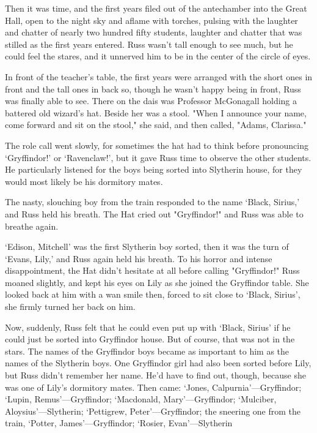 Then it was time, and the first years filed out of the antechamber into the Great Hall, open to the night sky and aflame with torches, pulsing with the laughter and chatter of nearly two hundred fifty students, laughter and chatter that was stilled as the first years entered. Russ wasn't tall enough to see much, but he could feel the stares, and it unnerved him to be in the center of the circle of eyes.

In front of the teacher's table, the first years were arranged with the short ones in front and the tall ones in back so, though he wasn't happy being in front, Russ was finally able to see. There on the dais was Professor McGonagall holding a battered old wizard's hat. Beside her was a stool. "When I announce your name, come forward and sit on the stool," she said, and then called, "Adams, Clarissa."

The role call went slowly, for sometimes the hat had to think before pronouncing `Gryffindor!' or `Ravenclaw!', but it gave Russ time to observe the other students. He particularly listened for the boys being sorted into Slytherin house, for they would most likely be his dormitory mates.

The nasty, slouching boy from the train responded to the name `Black, Sirius,' and Russ held his breath. The Hat cried out "Gryffindor!" and Russ was able to breathe again.

`Edison, Mitchell' was the first Slytherin boy sorted, then it was the turn of `Evans, Lily,' and Russ again held his breath. To his horror and intense disappointment, the Hat didn't hesitate at all before calling "Gryffindor!" Russ moaned slightly, and kept his eyes on Lily as she joined the Gryffindor table. She looked back at him with a wan smile then, forced to sit close to `Black, Sirius', she firmly turned her back on him.

Now, suddenly, Russ felt that he could even put up with `Black, Sirius' if he could just be sorted into Gryffindor house. But of course, that was not in the stars. The names of the Gryffindor boys became as important to him as the names of the Slytherin boys. One Gryffindor girl had also been sorted before Lily, but Russ didn't remember her name. He'd have to find out, though, because she was one of Lily's dormitory mates. Then came: `Jones, Calpurnia'—Gryffindor; `Lupin, Remus'—Gryffindor; `Macdonald, Mary'—Gryffindor; `Mulciber, Aloysius'—Slytherin; `Pettigrew, Peter'—Gryffindor; the sneering one from the train, `Potter, James'—Gryffindor; `Rosier, Evan'—Slytherin{\el}

